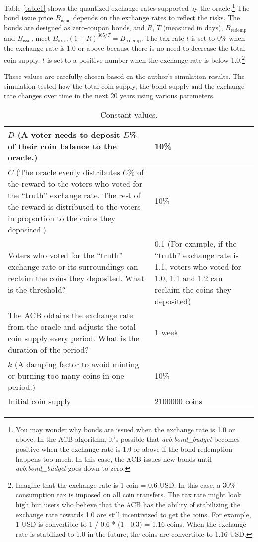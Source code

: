 \documentclass[dvipdfmx,a4paper]{article}
\begin{document}
Table \ref{table1} shows the quantized exchange rates supported by the oracle.\footnote{You may wonder why bonds are issued when the exchange rate is 1.0 or above. In the ACB algorithm, it's possible that \textit{acb.bond\_budget} becomes positive when the exchange rate is 1.0 or above if the bond redemption happens too much. In this case, the ACB issues new bonds until \textit{acb.bond\_budget} goes down to zero.} The bond issue price $B_{\mathrm{issue}}$ depends on the exchange rates to reflect the risks. The bonds are designed as zero-coupon bonds, and $R$, $T$ (measured in days), $B_{\mathrm{redemp}}$ and $B_{\mathrm{issue}}$ meet $B_{\mathrm{issue}}(1+R)^{365/T}=B_{\mathrm{redemp}}$. The tax rate $t$ is set to 0\% when the exchange rate is 1.0 or above because there is no need to decrease the total coin supply. $t$ is set to a positive number when the exchange rate is below 1.0.\footnote{Imagine that the exchange rate is 1 coin = 0.6 USD. In this case, a 30\% consumption tax is imposed on all coin transfers. The tax rate might look high but users who believe that the ACB has the ability of stabilizing the exchange rate towards 1.0 are still incentivized to get the coins. For example, 1 USD is convertible to 1 / 0.6 * (1 - 0.3) = 1.16 coins. When the exchange rate is stabilized to 1.0 in the future, the coins are convertible to 1.16 USD.}

These values are carefully chosen based on the author's simulation results. The simulation tested how the total coin supply, the bond supply and the exchange rate changes over time in the next 20 years using various parameters.

\begin{table}[htb]
\begin{center}
\caption{Constant values.}\vspace{2ex}
\begin{tabular}{p{26em}|p{10em}}\hline
$D$ (A voter needs to deposit $D$\% of their coin balance to the oracle.) & 10\%\\\hline
$C$ (The oracle evenly distributes $C$\% of the reward to the voters who voted for the ``truth'' exchange rate. The rest of the reward is distributed to the voters in proportion to the coins they deposited.) & 10\%\\\hline
Voters who voted for the ``truth'' exchange rate or its surroundings can reclaim the coins they deposited. What is the threshold? & 0.1 (For example, if the ``truth'' exchange rate is 1.1, voters who voted for 1.0, 1.1 and 1.2 can reclaim the coins they deposited)\\\hline
The ACB obtains the exchange rate from the oracle and adjusts the total coin supply every period. What is the duration of the period? & 1 week\\\hline
$k$ (A damping factor to avoid minting or burning too many coins in one period.) & 10\%\\\hline
Initial coin supply & 2100000 coins\\\hline
\end{tabular}
\label{table2}
\end{center}
\end{table}
\end{document}

